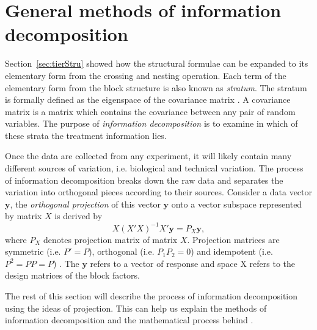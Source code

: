 \documentclass[article]{jss}
\begin{document}
\section[Information Decomposition]{General methods of information decomposition} \label{sec:infoDecomp}
Section~\ref{sec:tierStru} showed how the structural formulae can be expanded to its elementary form from the crossing and nesting operation. Each term of the elementary form from the block structure is also known as \emph{stratum}. The stratum is formally defined as the eigenspace of the covariance matrix \citep{Bailey2008}. A covariance matrix is a matrix which contains the covariance between any pair of random variables. The purpose of \emph{information decomposition} is to examine in which of these strata the treatment information lies. 

Once the data are collected from any experiment, it will likely contain many different sources of variation, i.e. biological and technical variation. The process of information decomposition breaks down the raw data and separates the variation into orthogonal pieces according to their sources. Consider a data vector $\bm{y}$, the \emph{orthogonal projection} of this vector $\bm{y}$ onto a vector subspace represented by matrix $X$ is derived by
\begin{equation}\label{eq:vectorProj}
X(X'X)^{-1}X' \bm{y} = P_{X} \bm{y},
\end{equation}
where $P_X$ denotes projection matrix of matrix $X$. Projection matrices are symmetric (i.e. $P' = P$), orthogonal (i.e. $P_1P_2 = 0$) and idempotent (i.e. $P^2 = PP = P$)  \citep{Hadi1996}. The $\bm{y}$ refers to a vector of response and space X refers to the design matrices of the block factors.

The rest of this section will describe the process of information decomposition using the ideas of projection. This can help us explain the methods of information decomposition and the mathematical process behind .
\end{document}
